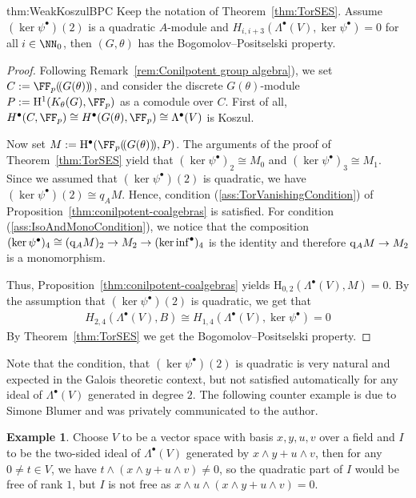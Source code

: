\documentclass{amsart}
\theoremstyle{definition}
\newtheorem{exmp}[thm]{Example}
\theoremstyle{remark}
\newcommand{\rmH}{\mathrm{H}}
\numberwithin{equation}{section}
\begin{document}
\begin{repthm}{thm:WeakKoszulBPC}
    Keep the notation of Theorem~\ref{thm:TorSES}. Assume $(\ker \psi^\bullet)(2)$ is a quadratic $A$-module and $H_{i,i+3}(\Lambda^\bullet(V),\ker\psi^\bullet)=0$ for all $i\in \NN_0$, then $(G,\theta)$ has the Bogomolov--Positselski property.
\end{repthm}

\begin{proof}
Following Remark~\ref{rem:Conilpotent group algebra}), we set $C:=\FF_p(\!(G(\theta))\!)$, and consider the discrete $G(\theta)$-module $P:=\rmH^1(K_\theta(G),\FF_p)$ as a comodule over $C$. First of all, $H^\bullet(C,\FF_p)\cong H^\bullet(G(\theta),\FF_p)\cong \Lambda^\bullet(V)$ is  Koszul.

Now set $M:=\rmH^\bullet(\FF_p(\!(G(\theta))\!),P)$. The arguments of the proof of Theorem~\ref{thm:TorSES} yield that $(\ker \psi^\bullet)_2\cong M_0$ and $(\ker \psi^\bullet)_3\cong M_1$. Since we assumed that $(\ker \psi^\bullet)(2)$ is quadratic, we have $(\ker \psi^\bullet)(2)\cong q_AM$. Hence, condition (\ref{ass:TorVanishingCondition}) of Proposition~\ref{thm:conilpotent-coalgebras} is satisfied. For condition (\ref{ass:IsoAndMonoCondition}), we notice that the composition $(\ker \psi^\bullet)_4\cong ({\rm q}_AM)_2\to M_2\to (\ker \inf^\bullet)_4$ is the identity and therefore ${\rm q}_AM\to M_2$ is a monomorphism.

Thus, Proposition~\ref{thm:conilpotent-coalgebras} yields $\rmH_{0,2}(\Lambda^\bullet(V),M)=0$. By the assumption that $(\ker \psi^\bullet)(2)$ is quadratic, we get that  
\begin{align*}
    H_{2,4}(\Lambda^\bullet(V),B)\cong H_{1,4}(\Lambda^\bullet(V),\ker \psi^\bullet)=0
\end{align*}
By Theorem~\ref{thm:TorSES} we get the Bogomolov--Positselski property.
\end{proof}
Note that the condition, that $(\ker \psi^\bullet)(2)$ is quadratic is very natural and expected in the Galois theoretic context, but not satisfied automatically for any ideal of $\Lambda^\bullet(V)$ generated in degree $2$. The following counter example is due to Simone Blumer and was privately communicated to the author.
\begin{exmp}
    \label{exmp:IdealNotQuadratic}
    Choose $V$ to be a vector space with basis $x,y,u,v$ over a field and $I$ to be the two-sided ideal of $\Lambda^\bullet(V)$ generated by $x\wedge y+u\wedge v$, then for any $0\neq t\in V$, we have $t\wedge(x\wedge y+u\wedge v)\neq 0$, so the quadratic part of $I$ would be free of rank $1$, but $I$ is not free as $x\wedge u\wedge (x\wedge y+u\wedge v)=0$.
\end{exmp}
\end{document}
